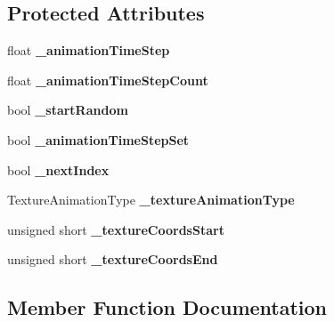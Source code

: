 \subsection*{Protected Attributes}
\begin{DoxyCompactItemize}
\item 
\mbox{\label{classPUTextureAnimator_ae6498ff0d0f1fdacf7d2e4b7570b5fb8}} 
float {\bfseries \+\_\+animation\+Time\+Step}
\item 
\mbox{\label{classPUTextureAnimator_a4fca63b740e9f7012b349f47b059ac1a}} 
float {\bfseries \+\_\+animation\+Time\+Step\+Count}
\item 
\mbox{\label{classPUTextureAnimator_a6bc2c73e2a92b3cbb10db79f37372d1d}} 
bool {\bfseries \+\_\+start\+Random}
\item 
\mbox{\label{classPUTextureAnimator_a52e90a344cffdb24b7eee2124c42c198}} 
bool {\bfseries \+\_\+animation\+Time\+Step\+Set}
\item 
\mbox{\label{classPUTextureAnimator_a90fe83f1b7563881f3d0822ec939ca3a}} 
bool {\bfseries \+\_\+next\+Index}
\item 
\mbox{\label{classPUTextureAnimator_a828382b24707f3733f34182360a28888}} 
Texture\+Animation\+Type {\bfseries \+\_\+texture\+Animation\+Type}
\item 
\mbox{\label{classPUTextureAnimator_a35d2f9b1f3e104770234df26dc060460}} 
unsigned short {\bfseries \+\_\+texture\+Coords\+Start}
\item 
\mbox{\label{classPUTextureAnimator_a35df5763e559867966a38a28e0b67a21}} 
unsigned short {\bfseries \+\_\+texture\+Coords\+End}
\end{DoxyCompactItemize}


\subsection{Member Function Documentation}
\mbox{\label{classPUTextureAnimator_ac5fc99a0f3da0295beb89fb8c08440cd}} 
